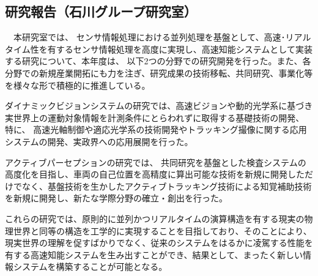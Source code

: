 \subsection{研究報告（石川グループ研究室）}






　本研究室では、 センサ情報処理における並列処理を基盤として、高速･リアルタイム性を有するセンサ情報処理を高度に実現し、高速知能システムとして実装する研究について、本年度は、 以下2つの分野での研究開発を行った。また、各分野での新規産業開拓にも力を注ぎ、研究成果の技術移転、共同研究、事業化等を様々な形で積極的に推進している。

ダイナミックビジョンシステムの研究では、高速ビジョンや動的光学系に基づき実世界上の運動対象情報を計測条件にとらわれずに取得する基礎技術の開発、 特に、 高速光軸制御や適応光学系の技術開発やトラッキング撮像に関する応用システムの開発、実政界への応用展開を行った。

アクティブパーセプションの研究では、 共同研究を基盤とした検査システムの高度化を目指し、車両の自己位置を高精度に算出可能な技術を新規に開発しただけでなく、基盤技術を生かしたアクティブトラッキング技術による知覚補助技術を新規に開発し、新たな学際分野の確立・創出を行った。

これらの研究では、原則的に並列かつリアルタイムの演算構造を有する現実の物理世界と同等の構造を工学的に実現することを目指しており、そのことにより、 現実世界の理解を促すばかりでなく、従来のシステムをはるかに凌駕する性能を有する高速知能システムを生み出すことができ、結果として、まったく新しい情報システムを構築することが可能となる。
